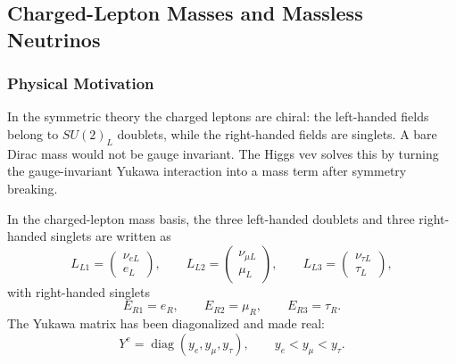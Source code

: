 
\subsection{Charged-Lepton Masses and Massless Neutrinos}\label{subsec:lec18:lepton-masses}

\subsubsection*{Physical Motivation}

In the symmetric theory the charged leptons are chiral: the left-handed fields
belong to $SU(2)_L$ doublets, while the right-handed fields are singlets. A
bare Dirac mass would not be gauge invariant. The Higgs vev solves this by
turning the gauge-invariant Yukawa interaction into a mass term after symmetry
breaking.

In the charged-lepton mass basis, the three left-handed doublets and three
right-handed singlets are written as
\begin{equation}
  L_{L1}=\begin{pmatrix}\nu_{eL}\\ e_L\end{pmatrix},
  \qquad
  L_{L2}=\begin{pmatrix}\nu_{\mu L}\\ \mu_L\end{pmatrix},
  \qquad
  L_{L3}=\begin{pmatrix}\nu_{\tau L}\\ \tau_L\end{pmatrix},
  \label{eq:lec18:left-lepton-doublets}
\end{equation}
with right-handed singlets
\begin{equation}
  E_{R1}=e_R,
  \qquad
  E_{R2}=\mu_R,
  \qquad
  E_{R3}=\tau_R .
  \label{eq:lec18:right-lepton-singlets}
\end{equation}
The Yukawa matrix has been diagonalized and made real:
\begin{equation}
  Y^e=\operatorname{diag}(y_e,y_\mu,y_\tau),
  \qquad
  y_e<y_\mu<y_\tau .
  \label{eq:lec18:diagonal-yukawa}
\end{equation}

